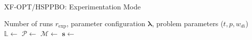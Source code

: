 \begin{algorithm}
	\caption{XF-OPT/HSPPBO: Experimentation Mode}
	\label{alg:xf-opt-run-exp}
	\begin{algorithmic}
		\Require Number of runs $r_{\text{exp}}$, parameter configuration $\mathbf{\lambda}$, problem parameters ($t, p, w_{di}$)
		\State $\mathbb{L}  \gets $  
		\State $\mathcal{P}  \gets $ 
		\State $\mathcal{M}  \gets $ 
			\State $\mathbf{s} \gets $ 
			\State {}
		\EndFor
	\end{algorithmic}
\end{algorithm}



